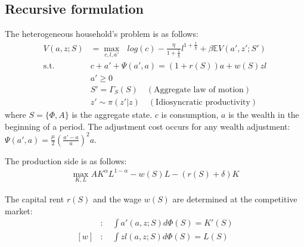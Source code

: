 \subsection*{Recursive formulation}
The heterogeneous household's problem is as follows:
\begin{align*}
  V(a,z;S) &= \max_{c,l,a'}\text{ } log(c) - \frac{\eta}{1+\frac{1}{\chi}}l^{1+\frac{1}{\chi}}+ \beta \mathbb{E}V(a',z';S')
  \\
  \text{s.t.}\quad& c + a' + \Psi(a',a)= (1+r(S))a + w(S)zl
  \\
  & a'\geq 0
  \\
  & S' = \Gamma_{S}(S) \quad(\text{Aggregate law of motion})
  \\
  & z' \sim \pi(z'|z) \quad(\text{Idiosyncratic productivity})
\end{align*}
where $S = \{\Phi,A\}$ is the aggregate state. $c$ is consumption, $a$ is the wealth in the beginning of a period. The adjustment cost occurs for any wealth adjustment: $\Psi(a',a) = \frac{\mu}{2}\left(\frac{a'-a}{a}\right)^{2}a$.

The production side is as follows:
\begin{align*}
  \max_{K,L} A K^{\alpha}L^{1-\alpha} - w(S)L - (r(S)+\delta)K
\end{align*}

The capital rent $r(S)$ and the wage $w(S)$ are determined at the competitive market:
\begin{align*}
  [r]&:\quad \int a'(a,z;S)d\Phi(S) = K'(S)
  \\
  [w]&:\quad \int z l(a,z;S) d\Phi(S) = L(S)
\end{align*}
